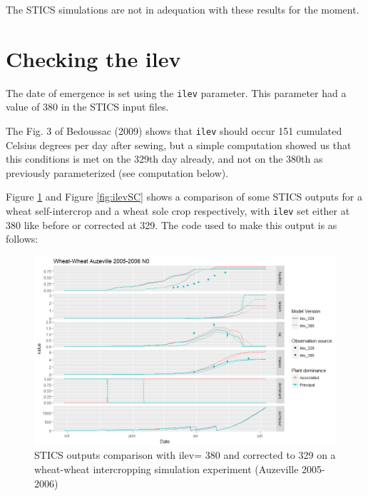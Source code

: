 \documentclass[]{book}
\begin{document}
The STICS simulations are not in adequation with these results for the moment.

\hypertarget{checking-the-ilev}{%
\section{Checking the ilev}\label{checking-the-ilev}}

The date of emergence is set using the \texttt{ilev} parameter. This parameter had a value of 380 in the STICS input files.

The Fig. 3 of Bedoussac (2009) shows that \texttt{ilev} should occur 151 cumulated Celsius degrees per day after sewing, but a simple computation showed us that this conditions is met on the 329th day already, and not on the 380th as previously parameterized (see computation below).

Figure \ref{fig:ilevIC} and Figure \ref{fig:ilevSC} shows a comparison of some STICS outputs for a wheat self-intercrop and a wheat sole crop respectively, with \texttt{ilev} set either at 380 like before or corrected at 329. The code used to make this output is as follows:

\begin{figure}
\centering
\includegraphics{img/ilev.png}
\caption{\label{fig:ilevIC}STICS outputs comparison with ilev= 380 and corrected to 329 on a wheat-wheat intercropping simulation experiment (Auzeville 2005-2006)}
\end{figure}
\end{document}
